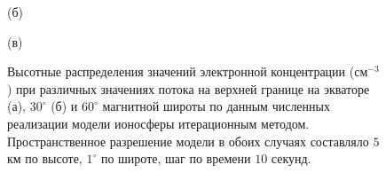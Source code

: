 \documentclass[14pt, a4paper]{extarticle}
\begin{document}
\begin{figure}[H]

(б)


\end{figure}

\begin{figure}[H]

(в)

\caption{Высотные распределения значений электронной концентрации (см$^{-3}$) при различных значениях потока на верхней границе на экваторе (а), $30^\circ$ (б) и $60^\circ$ магнитной широты по данным численных реализации модели ионосферы итерационным методом. Пространственное разрешение модели в обоих случаях составляло $5$ км по высоте, $1^\circ$ по широте, шаг по времени $10$ секунд.}
\end{figure}
\end{document}
